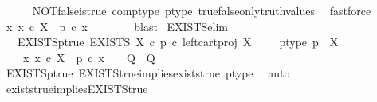\begin{isabellebody}
\ \ \ \ \isamarkupfalse%
\ NOT{\isacharunderscore}{\kern0pt}false{\isacharunderscore}{\kern0pt}is{\isacharunderscore}{\kern0pt}true\ comp{\isacharunderscore}{\kern0pt}type\ p{\isacharunderscore}{\kern0pt}type\ true{\isacharunderscore}{\kern0pt}false{\isacharunderscore}{\kern0pt}only{\isacharunderscore}{\kern0pt}truth{\isacharunderscore}{\kern0pt}values\ \isamarkupfalse%
\ fastforce\isanewline
\ \ \isamarkupfalse%
\ \isamarkupfalse%
\ {\isachardoublequoteopen}{\isasymexists}x{\isachardot}{\kern0pt}\ x\ {\isasymin}\isactrlsub c\ X\ {\isasymand}\ p\ {\isasymcirc}\isactrlsub c\ x\ {\isacharequal}{\kern0pt}\ {\isasymt}{\isachardoublequoteclose}\isanewline
\ \ \ \ \isamarkupfalse%
\ blast\isanewline
{}\isamarkupfalse%
%
\endisatagproof
{\isafoldproof}%
%
\isadelimproof
\isanewline
%
\endisadelimproof
\isanewline
{}\isamarkupfalse%
\ EXISTS{\isacharunderscore}{\kern0pt}elim{\isacharcolon}{\kern0pt}\isanewline
\ \ \ EXISTS{\isacharunderscore}{\kern0pt}p{\isacharunderscore}{\kern0pt}true{\isacharcolon}{\kern0pt}\ {\isachardoublequoteopen}EXISTS\ X\ {\isasymcirc}\isactrlsub c\ {\isacharparenleft}{\kern0pt}p\ {\isasymcirc}\isactrlsub c\ left{\isacharunderscore}{\kern0pt}cart{\isacharunderscore}{\kern0pt}proj\ X\ {\isasymone}{\isacharparenright}{\kern0pt}\isactrlsup {\isasymsharp}\ {\isacharequal}{\kern0pt}\ {\isasymt}{\isachardoublequoteclose}\ \ p{\isacharunderscore}{\kern0pt}type{\isacharcolon}{\kern0pt}\ {\isachardoublequoteopen}p\ {\isacharcolon}{\kern0pt}\ X\ {\isasymrightarrow}\ {\isasymOmega}{\isachardoublequoteclose}\isanewline
\ \ \ {\isachardoublequoteopen}{\isacharparenleft}{\kern0pt}{\isasymAnd}\ x{\isachardot}{\kern0pt}\ x\ {\isasymin}\isactrlsub c\ X\ {\isasymLongrightarrow}\ p\ {\isasymcirc}\isactrlsub c\ x\ {\isacharequal}{\kern0pt}\ {\isasymt}\ {\isasymLongrightarrow}\ Q{\isacharparenright}{\kern0pt}\ {\isasymLongrightarrow}\ Q{\isachardoublequoteclose}\isanewline
%
\isadelimproof
\ \ %
\endisadelimproof
%
\isatagproof
{}\isamarkupfalse%
\ EXISTS{\isacharunderscore}{\kern0pt}p{\isacharunderscore}{\kern0pt}true\ EXISTS{\isacharunderscore}{\kern0pt}true{\isacharunderscore}{\kern0pt}implies{\isacharunderscore}{\kern0pt}exists{\isacharunderscore}{\kern0pt}true\ p{\isacharunderscore}{\kern0pt}type\ \isamarkupfalse%
\ auto%
\endisatagproof
{\isafoldproof}%
%
\isadelimproof
\isanewline
%
\endisadelimproof
\isanewline
{}\isamarkupfalse%
\ exists{\isacharunderscore}{\kern0pt}true{\isacharunderscore}{\kern0pt}implies{\isacharunderscore}{\kern0pt}EXISTS{\isacharunderscore}{\kern0pt}true{\isacharcolon}{\kern0pt}\isanewline

\end{isabellebody}
